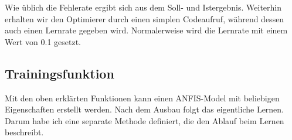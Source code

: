     Wie üblich die Fehlerate ergibt sich aus dem Soll- und Istergebnis.
Weiterhin erhalten wir den Optimierer durch einen simplen Codeaufruf,
während dessen auch einen Lernrate gegeben wird. Normalerweise wird die
Lernrate mit einem Wert von 0.1 gesetzt.

\hypertarget{trainingsfunktion}{%
\subsection{Trainingsfunktion}\label{trainingsfunktion}}

Mit den oben erklärten Funktionen kann einen ANFIS-Model mit beliebigen
Eigenschaften erstellt werden. Nach dem Ausbau folgt das eigentliche
Lernen. Darum habe ich eine separate Methode definiert, die den Ablauf
beim Lernen beschreibt.

%        
%        
%                
